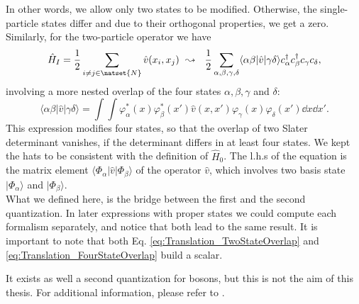 \documentclass[../main.tex]{subfile}
\begin{document}
In other words, we allow only two states to be modified. Otherwise, the single-particle
states differ and due to their orthogonal properties, we get a zero.\\

Similarly, for the two-particle operator we have
\begin{equation}\label{eq:SecondquantizationDoubleParticle}
    \hat{H}_I = \frac{1}{2}\sum_{i\neq j \in \natset{N}} \hat{v}(x_i, x_j) ~ \leadsto ~~ \frac{1}{2}\sum_{\alpha,\beta,\gamma,\delta}
     \langle \alpha\beta|\hat{v}|\gamma\delta\rangle c_{\alpha}^{\dagger}c_{\beta}^{\dagger}c_{\gamma}c_{\delta},
\end{equation}
involving a more nested overlap of the four states $\alpha,\beta,\gamma$ and $\delta$:
\begin{equation}\label{eq:Translation_FourStateOverlap}
    \langle\alpha\beta|\hat{v}|\gamma\delta\rangle = \int \int \varphi_{\alpha}^{\ast}(x) \varphi_{\beta}^{\ast}(x') \hat{v}(x,x') \varphi_{\gamma}(x) \varphi_{\delta}(x') \dd x \dd x'.
\end{equation}
This expression modifies four states, so that the overlap of two Slater determinant vanishes, if the determinant differs in at least four states. We kept the hats
to be consistent with the definition of $\hat{H}_0$. The l.h.s of the equation is the matrix element $\langle\Phi_{\alpha}|\hat{v}|\Phi_{\beta}\rangle$ of the operator
 $\hat{v}$, which involves two basis state $|\Phi_{\alpha}\rangle$ and $|\Phi_{\beta}\rangle$.\\
 
What we defined here, is the bridge between the first and the second quantization. In later expressions with proper states we could compute each formalism separately, 
and notice that both lead to the same result. It is important to note that both Eq. \ref{eq:Translation_TwoStateOverlap} and \ref{eq:Translation_FourStateOverlap}
build a scalar.

It exists as well a second quantization for bosons, but this is not the aim of this thesis. For additional information, please refer to \cite{Folk2014}.
\end{document}
